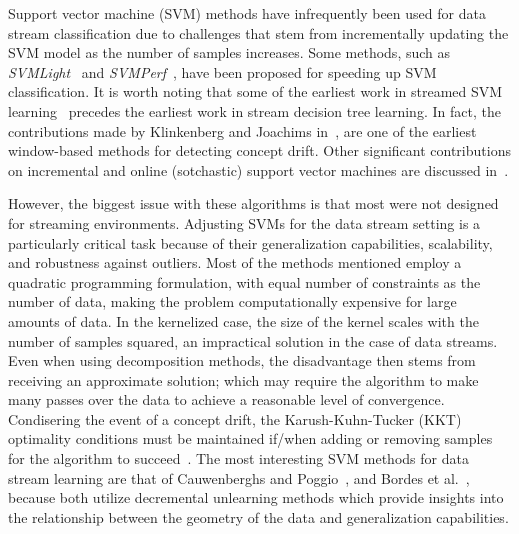 \documentclass[reqno]{vcuthesis}
\numberwithin{equation}{chapter}
\begin{document}
Support vector machine (SVM) methods have infrequently been used for data stream classification due to challenges that stem from incrementally updating the SVM model as the number of samples increases. Some methods, such as \textit{SVMLight}~\cite{Joachims1999} and \textit{SVMPerf}~\cite{joachims2006training}, have been proposed for speeding up SVM classification. It is worth noting that some of the earliest work in streamed SVM learning~\cite{klinkenberg2000detecting,syed1999handling} precedes the earliest work in stream decision tree learning. In fact, the contributions made by Klinkenberg and Joachims in~\cite{klinkenberg2000detecting}, are one of the earliest window-based methods for detecting concept drift. Other significant contributions on incremental and online (sotchastic) support vector machines are discussed in~\cite{bordes2005fast,cauwenberghs2001incremental,domeniconi2001incremental,fung2002incremental,ralaivola2001incremental,ruping2001incremental,shilton2005incremental}.

However, the biggest issue with these algorithms is that most were not designed for streaming environments. Adjusting SVMs for the data stream setting is a particularly critical task because of their generalization capabilities, scalability, and robustness against outliers. Most of the methods mentioned employ a quadratic programming formulation, with equal number of constraints as the number of data, making the problem computationally expensive for large amounts of data. In the kernelized case, the size of the kernel scales with the number of samples squared, an impractical solution in the case of data streams. Even when using decomposition methods, the disadvantage then stems from receiving an approximate solution; which may require the algorithm to make many passes over the data to achieve a reasonable level of convergence. Condisering the event of a concept drift, the Karush-Kuhn-Tucker (KKT) optimality conditions must be maintained if/when adding or removing samples for the algorithm to succeed~\cite{aggarwal}. The most interesting SVM methods for data stream learning are that of Cauwenberghs and Poggio~\cite{cauwenberghs2001incremental}, and Bordes et al.~\cite{bordes2005fast}, because both utilize decremental unlearning methods which provide insights into the relationship between the geometry of the data and generalization capabilities.
\end{document}
